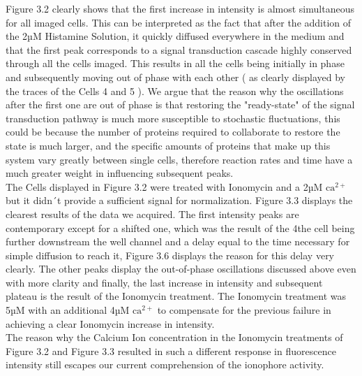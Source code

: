 \documentclass[a4paper,english,12pt,bibliography=totoc]{scrreprt}
\begin{document}
Figure 3.2 clearly shows that the first increase in intensity is almost simultaneous for all imaged cells. This can be interpreted as the fact that after the addition of the 2µM Histamine Solution, it quickly diffused everywhere in the medium and that the 
first peak corresponds to a signal transduction cascade highly conserved through all the cells imaged. This results in all the cells being initially in phase
and subsequently moving out of phase with each other ( as clearly displayed by the traces of the Cells 4 and 5 ).\newline
We argue that the reason why the oscillations after the first one are out of phase is that restoring the "ready-state" of the signal transduction pathway is much more susceptible to stochastic fluctuations, this could be because the number of proteins required to collaborate to restore the state is much larger, and the specific amounts of proteins that make up this system vary greatly between single cells, therefore reaction rates and time have a much greater weight in influencing subsequent peaks.\newline
\\
The Cells displayed in Figure 3.2 were treated with Ionomycin and a 2µM $\mathrm{ca^{2+}}$ but it didn´t provide a sufficient signal for normalization. 
Figure 3.3 displays the clearest results of the data we acquired. The first intensity peaks are contemporary except for a shifted one, which was the result of the 4the cell being further downstream the well channel and a delay equal to the time necessary for simple diffusion to reach it, Figure 3.6 displays the reason for this delay very clearly.\newline
The other peaks display the out-of-phase oscillations discussed above even with more clarity and finally, the last increase in intensity  and subsequent plateau is the result of the Ionomycin treatment.
The  Ionomycin treatment was 5µM with an additional 4µM $\mathrm{ca^{2+}}$ to compensate for the previous failure in achieving a clear Ionomycin increase in intensity.\\

The reason why the Calcium Ion concentration in the Ionomycin treatments of Figure 3.2 and Figure 3.3 resulted in such a different response in fluorescence intensity still escapes our current comprehension of the ionophore activity.\\
\end{document}
